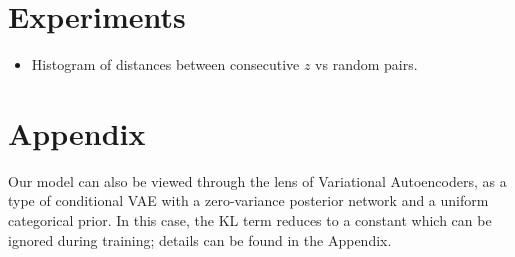 \documentclass{article}
\begin{document}
\section{Experiments}

\begin{itemize}
\item Histogram of distances between consecutive $z$ vs random pairs.
\end{itemize}

%
%
%
%
%
%


\section{Appendix}

Our model can also be viewed through the lens of Variational Autoencoders, as a type of conditional VAE with a zero-variance posterior network and a uniform categorical prior.
In this case, the KL term reduces to a constant which can be ignored during training; details can be found in the Appendix.
\end{document}
